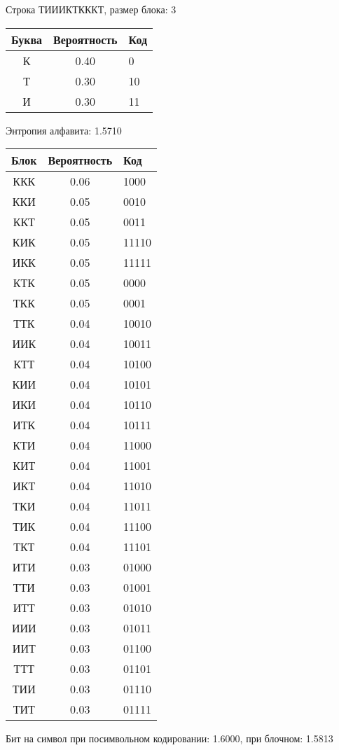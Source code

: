 \documentclass[a4paper, 12pt]{article}
\begin{document}
Строка ТИИИКТКККТ, размер блока: 3
\begin{center}
 \begin{tabular}{ |c|c|l| } 
  \hline
     Буква & Вероятность & Код\\ \hline
К & 0.40 & 0\\\hline
Т & 0.30 & 10\\\hline
И & 0.30 & 11
\\ \hline \end{tabular}
\end{center}
Энтропия алфавита: 1.5710
\begin{center}
 \begin{tabular}{ |c|c|l| } 
  \hline
     Блок & Вероятность & Код\\ \hline
ККК & 0.06 & 1000\\\hline
ККИ & 0.05 & 0010\\\hline
ККТ & 0.05 & 0011\\\hline
КИК & 0.05 & 11110\\\hline
ИКК & 0.05 & 11111\\\hline
КТК & 0.05 & 0000\\\hline
ТКК & 0.05 & 0001\\\hline
ТТК & 0.04 & 10010\\\hline
ИИК & 0.04 & 10011\\\hline
КТТ & 0.04 & 10100\\\hline
КИИ & 0.04 & 10101\\\hline
ИКИ & 0.04 & 10110\\\hline
ИТК & 0.04 & 10111\\\hline
КТИ & 0.04 & 11000\\\hline
КИТ & 0.04 & 11001\\\hline
ИКТ & 0.04 & 11010\\\hline
ТКИ & 0.04 & 11011\\\hline
ТИК & 0.04 & 11100\\\hline
ТКТ & 0.04 & 11101\\\hline
ИТИ & 0.03 & 01000\\\hline
ТТИ & 0.03 & 01001\\\hline
ИТТ & 0.03 & 01010\\\hline
ИИИ & 0.03 & 01011\\\hline
ИИТ & 0.03 & 01100\\\hline
ТТТ & 0.03 & 01101\\\hline
ТИИ & 0.03 & 01110\\\hline
ТИТ & 0.03 & 01111
\\ \hline \end{tabular}
\end{center}
Бит на символ при посимвольном кодировании: 1.6000, при блочном: 1.5813
\end{document}
